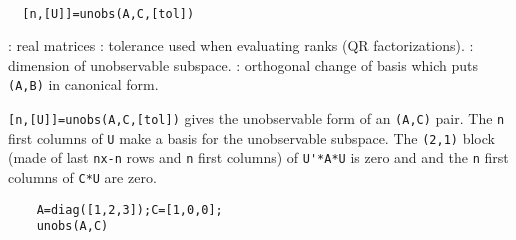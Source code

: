 \begin{mandesc}
   \\ %
\end{mandesc}
\begin{calling_sequence}
\begin{verbatim}
  [n,[U]]=unobs(A,C,[tol])   
\end{verbatim}
\end{calling_sequence}
\begin{parameters}
  \begin{varlist}
    : real matrices
    : tolerance used when evaluating ranks (QR factorizations).
    : dimension of unobservable subspace.
    : orthogonal change of basis which puts \verb!(A,B)! in canonical form.
  \end{varlist}
\end{parameters}
\begin{mandescription}
  \verb![n,[U]]=unobs(A,C,[tol])! gives the unobservable form of an \verb!(A,C)!
  pair.  The \verb!n! first columns of \verb!U! make a basis for the
  unobservable subspace.  The \verb!(2,1)! block (made of last \verb!nx-n! rows
  and \verb!n! first columns) of \verb!U'*A*U! is zero and and the \verb!n!
  first columns of \verb!C*U! are zero.
\end{mandescription}
\begin{examples}
  \begin{Verbatim}
    A=diag([1,2,3]);C=[1,0,0];
    unobs(A,C)
  \end{Verbatim}
\end{examples}
\begin{manseealso}
     
      
\end{manseealso}
